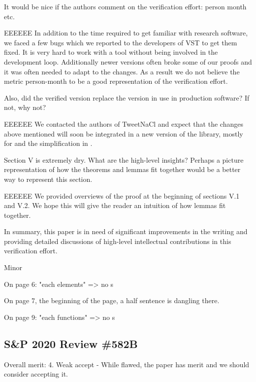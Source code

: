 It would be nice if the authors comment on the verification
effort: person month etc.

\begin{answer}{EEEEEE}
In addition to the time required to get familiar with
research software, we faced a few bugs which we reported
to the developers of VST to get them fixed.
It is very hard to work with a tool without being involved
in the development loop. Additionally newer versions often
broke some of our proofs and it was often needed to adapt
to the changes.
As a result we do not believe the metric person-month to be
a good representation of the verification effort.
\end{answer}

Also, did the verified version replace the version in use in
production software? If not, why not?

\begin{answer}{EEEEEE}
We contacted the authors of TweetNaCl and expect that
the changes above mentioned will soon be integrated in a
new version of the library, mostly for  and the
simplification in .
\end{answer}

Section V is extremely dry. What are the high-level insights?
Perhaps a picture representation of how the theorems
and lemmas fit together would be a better way to represent
this section.

\begin{answer}{EEEEEE}
We provided overviews of the proof at the beginning of sections
V.1 and V.2. We hope this will give the reader an intuition
of how lemmas fit together.
\end{answer}

In summary, this paper is in need of significant improvements
in the writing and providing detailed discussions of
high-level intellectual contributions in this verification effort.

{\color{gray}
Minor

On page 6: "each elements" => no s

On page 7, the beginning of the page, a half sentence is
dangling there.

On page 9: "each functions" => no s}


\subsection{S\&P 2020 Review \#582B}

Overall merit: 4. Weak accept - While flawed, the paper has
merit and we should consider accepting it.


